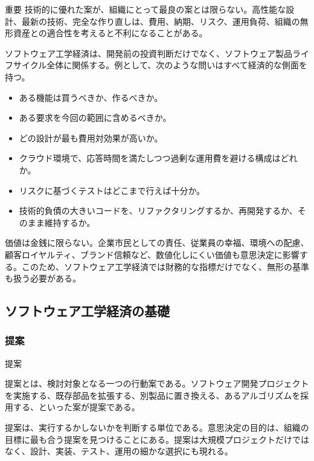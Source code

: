 \documentclass[a4paper,11pt]{ltjsarticle}
\numberwithin{figure}{section}
\numberwithin{table}{section}
\newcounter{definition}
\begin{document}
\begin{pointbox}{重要}
技術的に優れた案が、組織にとって最良の案とは限らない。高性能な設計、最新の技術、完全な作り直しは、費用、納期、リスク、運用負荷、組織の無形資産との適合性を考えると不利になることがある。
\end{pointbox}

ソフトウェア工学経済は、開発前の投資判断だけでなく、ソフトウェア製品ライフサイクル全体に関係する。例として、次のような問いはすべて経済的な側面を持つ。
\begin{itemize}
  \item ある機能は買うべきか、作るべきか。
  \item ある要求を今回の範囲に含めるべきか。
  \item どの設計が最も費用対効果が高いか。
  \item クラウド環境で、応答時間を満たしつつ過剰な運用費を避ける構成はどれか。
  \item リスクに基づくテストはどこまで行えば十分か。
  \item 技術的負債の大きいコードを、リファクタリングするか、再開発するか、そのまま維持するか。
\end{itemize}

価値は金銭に限らない。企業市民としての責任、従業員の幸福、環境への配慮、顧客ロイヤルティ、ブランド信頼など、数値化しにくい価値も意思決定に影響する。このため、ソフトウェア工学経済では財務的な指標だけでなく、無形の基準も扱う必要がある。

\subsection{ソフトウェア工学経済の基礎}

\subsubsection{提案}

\begin{definitionbox}提案\par\smallskip
提案とは、検討対象となる一つの行動案である。ソフトウェア開発プロジェクトを実施する、既存部品を拡張する、別製品に置き換える、あるアルゴリズムを採用する、といった案が提案である。
\end{definitionbox}

提案は、実行するかしないかを判断する単位である。意思決定の目的は、組織の目標に最も合う提案を見つけることにある。提案は大規模プロジェクトだけではなく、設計、実装、テスト、運用の細かな選択にも現れる。
\end{document}
